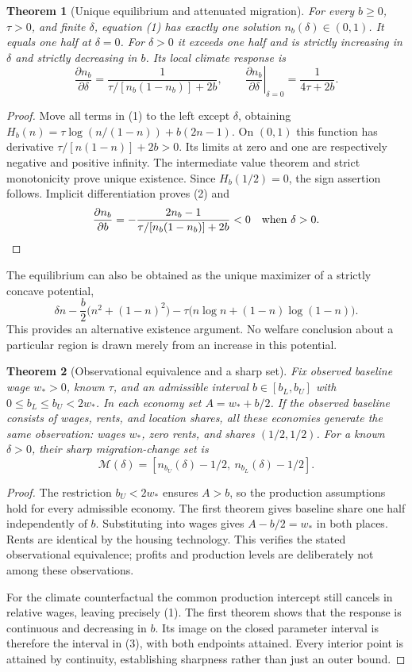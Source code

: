 \documentclass[11pt]{article}
\newtheorem{theorem}{Theorem}
\theoremstyle{definition}
\begin{document}
\begin{theorem}[Unique equilibrium and attenuated migration]
For every $b\geq0$, $\tau>0$, and finite $\delta$, equation (1) has exactly one solution $n_b(\delta)\in(0,1)$. It equals one half at $\delta=0$. For $\delta>0$ it exceeds one half and is strictly increasing in $\delta$ and strictly decreasing in $b$. Its local climate response is
\[
 \frac{\partial n_b}{\partial\delta}
 =\frac{1}{\tau/[n_b(1-n_b)]+2b},\qquad
 \left.\frac{\partial n_b}{\partial\delta}\right|_{\delta=0}
 =\frac{1}{4\tau+2b}.
 \tag{2}
\]
\end{theorem}
\begin{proof}
Move all terms in (1) to the left except $\delta$, obtaining
$H_b(n)=\tau\log(n/(1-n))+b(2n-1)$. On $(0,1)$ this function has derivative $\tau/[n(1-n)]+2b>0$. Its limits at zero and one are respectively negative and positive infinity. The intermediate value theorem and strict monotonicity prove unique existence. Since $H_b(1/2)=0$, the sign assertion follows. Implicit differentiation proves (2) and
\[
 \frac{\partial n_b}{\partial b}
 =-\frac{2n_b-1}{\tau/[n_b(1-n_b)]+2b}<0
 \quad\hbox{when }\delta>0.
\]
\end{proof}

The equilibrium can also be obtained as the unique maximizer of a strictly concave potential,
\[
 \delta n-\frac b2\bigl(n^2+(1-n)^2\bigr)
 -\tau\bigl(n\log n+(1-n)\log(1-n)\bigr).
\]
This provides an alternative existence argument. No welfare conclusion about a particular region is drawn merely from an increase in this potential.

\begin{theorem}[Observational equivalence and a sharp set]
Fix observed baseline wage $w_*>0$, known $\tau$, and an admissible interval $b\in[b_L,b_U]$ with $0\leq b_L\leq b_U<2w_*$. In each economy set $A=w_*+b/2$. If the observed baseline consists of wages, rents, and location shares, all these economies generate the same observation: wages $w_*$, zero rents, and shares $(1/2,1/2)$. For a known $\delta>0$, their sharp migration-change set is
\[
 \mathcal M(\delta)=
 [n_{b_U}(\delta)-1/2,\ n_{b_L}(\delta)-1/2].
 \tag{3}
\]
\end{theorem}
\begin{proof}
The restriction $b_U<2w_*$ ensures $A>b$, so the production assumptions hold for every admissible economy. The first theorem gives baseline share one half independently of $b$. Substituting into wages gives $A-b/2=w_*$ in both places. Rents are identical by the housing technology. This verifies the stated observational equivalence; profits and production levels are deliberately not among these observations.

For the climate counterfactual the common production intercept still cancels in relative wages, leaving precisely (1). The first theorem shows that the response is continuous and decreasing in $b$. Its image on the closed parameter interval is therefore the interval in (3), with both endpoints attained. Every interior point is attained by continuity, establishing sharpness rather than just an outer bound.
\end{proof}
\end{document}
